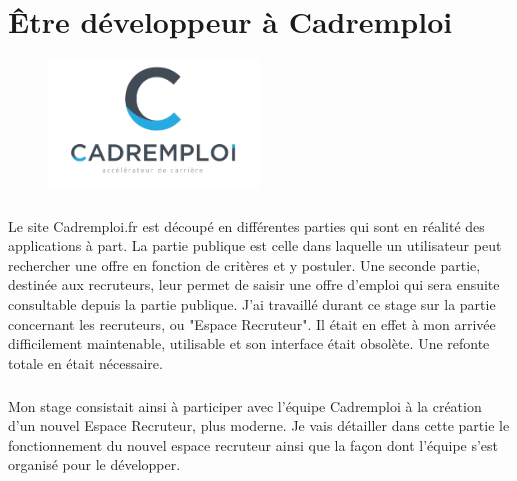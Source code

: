 
\chapter{Être développeur à Cadremploi} %

\label{apports} %


\begin{figure}[h]
  \begin{center}
    \hspace*{-1in}
    \includegraphics[width=0.5\textwidth]{Pictures/CE_logo.png}
  \end{center}
\end{figure}
\paragraph{}
Le site Cadremploi.fr est découpé en différentes parties qui sont en réalité des applications à part.
La partie publique est celle dans laquelle un utilisateur peut rechercher une offre en fonction de critères et y postuler.
Une seconde partie, destinée aux recruteurs, leur permet de saisir une offre d'emploi qui sera ensuite consultable depuis la partie publique.
J'ai travaillé durant ce stage sur la partie concernant les recruteurs, ou "Espace Recruteur".
Il était en effet à mon arrivée difficilement maintenable, utilisable et son interface était obsolète.
Une refonte totale en était nécessaire.
\paragraph{}
Mon stage consistait ainsi à participer avec l'équipe Cadremploi à la création d'un nouvel Espace Recruteur, plus moderne.
Je vais détailler dans cette partie le fonctionnement du nouvel espace recruteur ainsi que la façon dont l'équipe s'est organisé pour le développer.







